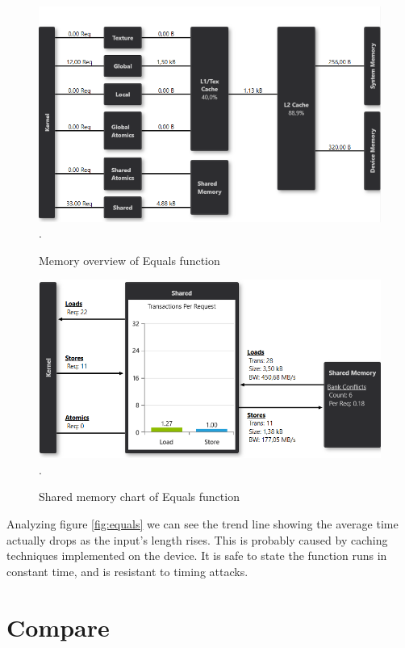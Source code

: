 \documentclass[oneside,openright,12pt,final,en]{mgr}
\begin{document}
\begin{figure}[H]
	\centering
	\includegraphics[width=\textwidth]{equals_memory}.
	\caption{Memory overview of Equals function}
	\label{fig:equals_memory}
\end{figure}

\begin{figure}[H]
	\centering
	\includegraphics[width=\textwidth]{equals_shared}.
	\caption{Shared memory chart of Equals function}
	\label{fig:equals_shared}
\end{figure}

 Analyzing figure \ref{fig:equals} we can see the trend line showing the average time actually drops as the input's length rises. This is probably caused by caching techniques implemented on the device. It is safe to state the function runs in constant time, and is resistant to timing attacks. 

\section{Compare}
\end{document}
